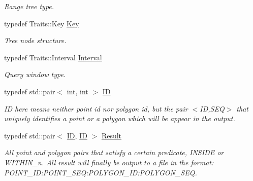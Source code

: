 \begin{DoxyCompactItemize}
\begin{DoxyCompactList}\small\item\em Range tree type. \end{DoxyCompactList}\item 
\hypertarget{namespaceSigSpatial2013_af9823bd0b551eb301830d664ba571a15}{typedef Traits\-::\-Key \hyperlink{namespaceSigSpatial2013_af9823bd0b551eb301830d664ba571a15}{Key}}\label{namespaceSigSpatial2013_af9823bd0b551eb301830d664ba571a15}

\begin{DoxyCompactList}\small\item\em Tree node structure. \end{DoxyCompactList}\item 
\hypertarget{namespaceSigSpatial2013_aac40440b3bd8f75ef62e075b8958fece}{typedef Traits\-::\-Interval \hyperlink{namespaceSigSpatial2013_aac40440b3bd8f75ef62e075b8958fece}{Interval}}\label{namespaceSigSpatial2013_aac40440b3bd8f75ef62e075b8958fece}

\begin{DoxyCompactList}\small\item\em Query window type. \end{DoxyCompactList}\item 
\hypertarget{namespaceSigSpatial2013_a69c1e827245441b25a541c97b741b97c}{typedef std\-::pair$<$ int, int $>$ \hyperlink{namespaceSigSpatial2013_a69c1e827245441b25a541c97b741b97c}{I\-D}}\label{namespaceSigSpatial2013_a69c1e827245441b25a541c97b741b97c}

\begin{DoxyCompactList}\small\item\em I\-D here means neither point id nor polygon id, but the pair $<$I\-D,S\-E\-Q$>$ that uniquely identifies a point or a polygon which will be appear in the output. \end{DoxyCompactList}\item 
\hypertarget{namespaceSigSpatial2013_af3568b84c52aee7ab5aa8f15fb019d7f}{typedef std\-::pair$<$ \hyperlink{namespaceSigSpatial2013_a69c1e827245441b25a541c97b741b97c}{I\-D}, \hyperlink{namespaceSigSpatial2013_a69c1e827245441b25a541c97b741b97c}{I\-D} $>$ \hyperlink{namespaceSigSpatial2013_af3568b84c52aee7ab5aa8f15fb019d7f}{Result}}\label{namespaceSigSpatial2013_af3568b84c52aee7ab5aa8f15fb019d7f}

\begin{DoxyCompactList}\small\item\em All point and polygon pairs that satisfy a certain predicate, I\-N\-S\-I\-D\-E or W\-I\-T\-H\-I\-N\-\_\-n. All result will finally be output to a file in the format\-: {\ttfamily P\-O\-I\-N\-T\-\_\-\-I\-D\-:\-P\-O\-I\-N\-T\-\_\-\-S\-E\-Q\-:\-P\-O\-L\-Y\-G\-O\-N\-\_\-\-I\-D\-:P\-O\-L\-Y\-G\-O\-N\-\_\-\-S\-E\-Q}. \end{DoxyCompactList}\end{DoxyCompactItemize}
